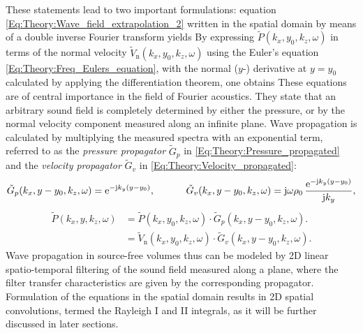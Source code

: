 \vspace{3mm}
These statements lead to two important formulations:
equation \eqref{Eq:Theory:Wave_field_extrapolation_2} written in the spatial domain by means of a double inverse Fourier transform yields
By expressing $\tilde{P}(k_x,y_0,k_z,\omega)$ in terms of the normal velocity $\tilde{V}_{\mathrm{n}}(k_x,y_0,k_z,\omega)$ using the Euler's equation  \eqref{Eq:Theory:Freq_Eulers_equation}, with the normal ($y$-) derivative at $y = y_0$ calculated by applying the differentiation theorem, one obtains
These equations are of central importance in the field of Fourier acoustics. 
They state that an arbitrary sound field is completely determined by either the pressure, or by the normal velocity component measured along an infinite plane. 
Wave propagation is calculated by multiplying the measured spectra with an exponential term, referred to as the \emph{pressure propagator} $\tilde{G}_p$ in \eqref{Eq:Theory:Pressure_propagated} and the \emph{velocity propagator} $\tilde{G}_v$ in \eqref{Eq:Theory:Velocity_propagated}:
\begin{equation}
\tilde{G}_p(k_x,y-y_0,k_z,\omega) = \mathrm{e}^{-\mathrm{j} k_y ( y - y_0 ) } ,\ \hspace{1cm}
\tilde{G}_v(k_x,y-y_0,k_z,\omega) = \mathrm{j} \omega \rho_0 \, \frac{\mathrm{e}^{-\mathrm{j} k_y ( y - y_0 ) } }{\mathrm{j} k_y},
\label{Eq:Theory:propagators}
\end{equation}
\begin{align}
\tilde{P}(k_x,y,k_z,\omega) &= \tilde{P}(k_x,y_0,k_z,\omega) \cdot \tilde{G}_p(k_x,y-y_0,k_z,\omega). \\
                            &= \tilde{V}_{\mathrm{n}}(k_x,y_0,k_z,\omega) \cdot \tilde{G}_v(k_x,y-y_0,k_z,\omega).
\end{align}
Wave propagation in source-free volumes thus can be modeled by 2D linear spatio-temporal filtering of the sound field measured along a plane, where the filter transfer characteristics are given by the corresponding propagator.
Formulation of the equations in the spatial domain results in 2D spatial convolutions, termed the Rayleigh I and II integrals, as it will be further discussed in later sections.


